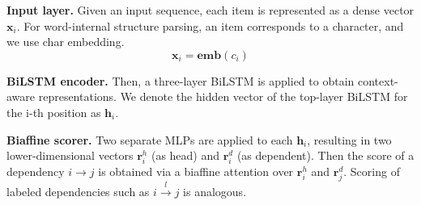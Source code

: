 \textbf{Input layer.} 
Given an input sequence, 
each item is represented as a dense vector $\mathbf{x}_i$. 
For word-internal structure parsing, an item corresponds to a character, and we use char embedding. 
\begin{equation}
\mathbf{x}_i = \mathbf{emb}(c_i) 
\end{equation}

\textbf{BiLSTM encoder.} 
Then, a three-layer BiLSTM is applied to obtain  context-aware representations. 
We denote the hidden vector of the top-layer BiLSTM for  the i-th position as $\mathbf{h}_i$.

\textbf{Biaffine scorer.} %
Two separate MLPs are applied to each $\mathbf{h}_i$, resulting in 
two lower-dimensional vectors $ \mathbf{r}_{i}^{h}$ (as head) and $\mathbf{r}_{i}^{d}$ (as dependent).
Then the score of a dependency $i \rightarrow j$ is obtained via a biaffine attention over $\mathbf{r}_{i}^{h}$ and $\mathbf{r}_{j}^{d}$. 
Scoring of labeled dependencies such as $i \xrightarrow{l} j$ is analogous. 



